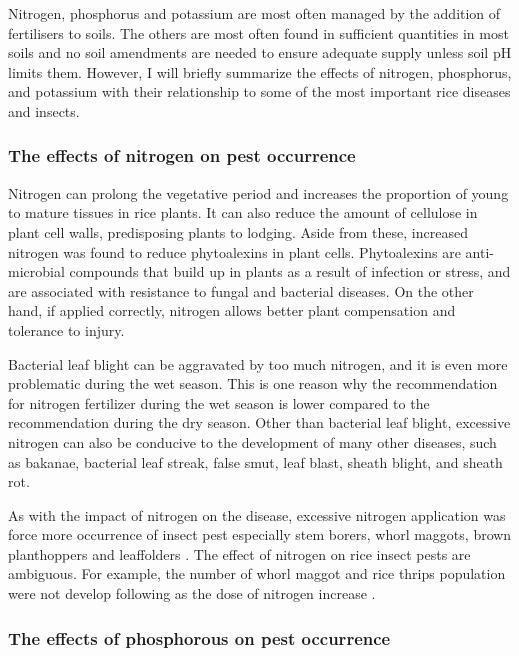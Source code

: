 Nitrogen, phosphorus and potassium are most often managed by the addition of fertilisers to soils. The others are most often found in sufficient quantities in most soils and no soil amendments are needed to ensure adequate supply unless soil pH limits them. However, I will briefly summarize the effects of nitrogen, phosphorus, and potassium with their relationship to some of the most important rice diseases and insects.

\subsubsection{The effects of nitrogen on pest occurrence}

Nitrogen can prolong the vegetative period and increases the proportion of young to mature tissues in rice plants. It can also reduce the amount of cellulose in plant cell walls, predisposing plants to lodging. Aside from these, increased nitrogen was found to reduce phytoalexins in plant cells. Phytoalexins are anti-microbial compounds that build up in plants as a result of infection or stress, and are associated with resistance to fungal and bacterial diseases. On the other hand, if applied correctly, nitrogen allows better plant compensation and tolerance to injury.

Bacterial leaf blight can be aggravated by too much nitrogen, and it is even more problematic during the wet season. This is one reason why the recommendation for nitrogen fertilizer during the wet season is lower compared to the recommendation during the dry season. Other than bacterial leaf blight, excessive nitrogen can also be conducive to the development of many other diseases, such as bakanae, bacterial leaf streak, false smut, leaf blast, sheath blight, and sheath rot.

As with the impact of nitrogen on the disease, excessive nitrogen application was force more occurrence of insect pest especially stem borers, whorl maggots, brown planthoppers and leaffolders \citep{chau2003impacts,litsinger2011cultural,rashid2014effect}. The effect of nitrogen on rice insect pests are ambiguous. For example, the number of whorl maggot and rice thrips population were not develop following as the dose of nitrogen increase \citep{chau2003impacts}.

\subsubsection{The effects of phosphorous on pest occurrence}

